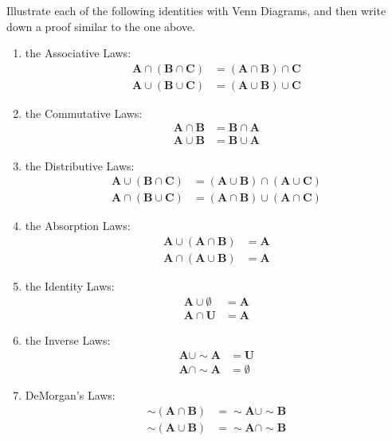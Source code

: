 \documentclass{article}
\newcommand\A{\mathbf A}
\newcommand\B{\mathbf B}
\newcommand\C{\mathbf C}
\newcommand\U{\mathbf U}
\newcommand{\0}{\mathbf 0}
\newcommand{\1}{\mathbf 1}
\begin{document}
Illustrate each of the following identities with Venn Diagrams, and then write down a proof similar to the one above.
\begin{enumerate}
  \item the Associative Laws:
    \begin{align*}
    \A \cap (\B \cap \C) & = (\A \cap \B) \cap \C \\
    \A \cup (\B \cup \C) & = (\A \cup \B) \cup \C
    \end{align*}

  \item the Commutative Laws:
    \begin{align*}
    \A \cap \B & = \B \cap \A \\
    \A \cup \B & = \B \cup \A
    \end{align*}

 \item the Distributive Laws:
    \begin{align*}
    \A \cup (\B \cap \C) & = (\A \cup \B) \cap (\A \cup \C) \\
    \A \cap (\B \cup \C) & = (\A \cap \B) \cup (\A \cap \C)
    \end{align*}

 \item the Absorption Laws:
    \begin{align*}
    \A \cup (\A \cap \B) & = \A \\
    \A \cap (\A \cup \B) & = \A
    \end{align*}

 \item the Identity Laws:
    \begin{align*}
    \A \cup \emptyset & = \A \\
    \A \cap \U & = \A
    \end{align*}

 \item the Inverse Laws:
    \begin{align*}
    \A \cup \sim \A & = \U \\
    \A \cap \sim \A & = \emptyset
    \end{align*}

 \item DeMorgan's Laws:
    \begin{align*}
    \sim(\A \cap \B) & = \sim\A \cup \sim \B \\
    \sim(\A \cup \B) & = \sim\A \cap \sim \B
    \end{align*}
\end{enumerate}
\end{document}
